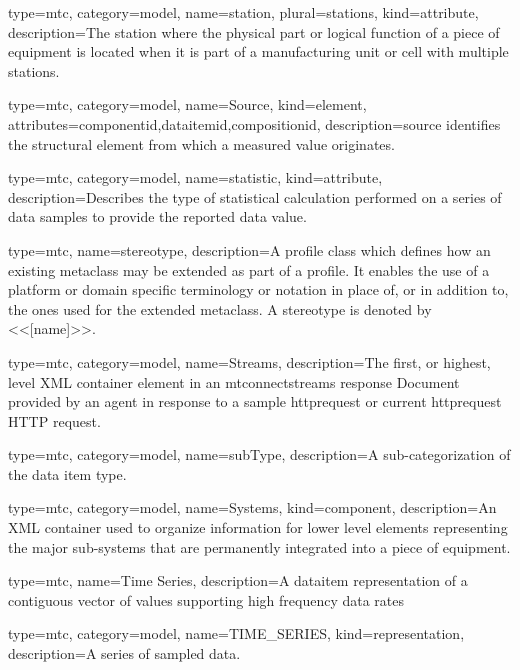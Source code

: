 {
  type=mtc,
  category=model,
  name={station},
  plural={stations},
  kind={attribute},
  description={The station where the physical part or logical function of a piece of equipment is located when it is part of a manufacturing unit or cell with multiple stations.}
}


{
  type=mtc,
  category=model,
  name={Source},
  kind={element},
  attributes={\gls{componentid},\gls{dataitemid},\gls{compositionid}},
  description={\gls{source} identifies the \gls{structural element} from which a measured value originates.}
}


{
  type=mtc,
  category=model,
  name={statistic},
  kind={attribute},
  description={Describes the type of statistical calculation performed on a series of data samples to provide the reported data value.}
}


{
  type=mtc,
  name=stereotype,
  description={A profile class which defines how an existing metaclass may be extended as part of a profile. It enables the use of a platform or domain specific terminology or notation in place of, or in addition to, the ones used for the extended metaclass. A stereotype is denoted by <<[name]>>.}
}


{
  type=mtc,
  category=model,
  name={Streams},
  description={The first, or highest, level XML container element in an \glspl{mtconnectstream} \gls{response} Document provided by an \gls{agent} in response to a \gls{sample httprequest} or \gls{current httprequest} HTTP \gls{request}.}
}


{
  type=mtc,
  category=model,
  name={subType},
  description={A sub-categorization of the data item \gls{type}.}
}


{
  type=mtc,
  category=model,
  name={Systems},
  kind={component},
  description={An XML container used to organize information for \gls{lower level} elements representing the major sub-systems that are permanently integrated into a piece of equipment.}
}


{
  type=mtc,
  name={Time Series},
  description={A \gls{dataitem} representation of a contiguous vector of values supporting high frequency data rates}
}


{
  type=mtc,
  category=model,
  name={TIME\_SERIES},
  kind={representation},
  description={A series of sampled data. }
}


